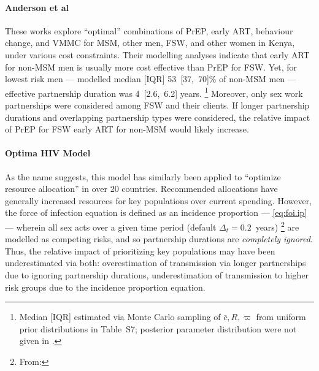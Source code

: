 \paragraph{Anderson et al}\cite{Anderson2014,Anderson2017,Anderson2018}  %
These works explore ``optimal'' combinations of PrEP, early ART, behaviour change, and VMMC  
for MSM, other men, FSW, and other women in Kenya, under various cost constraints.
Their modelling analyses indicate that
early ART for non-MSM men is usually more cost effective than PrEP for FSW.
Yet, for lowest risk men --- modelled median [IQR] 53~[37,~70]\% of non-MSM men ---
effective partnership duration was 4~[2.6,~6.2] years.%
\footnote{Median [IQR] estimated via Monte Carlo sampling of $\bar{c}, R, \varpi$
  from uniform prior distributions in Table~S7;
  posterior parameter distribution were not given in \cite{Anderson2014}.}
Moreover, only sex work partnerships were considered among FSW and their clients.
If longer partnership durations and overlapping partnership types were considered,
the relative impact of PrEP for FSW \vs early ART for non-MSM would likely increase.
\paragraph{Optima HIV Model}\cite{Kerr2015,Stuart2018,Kerr2020,Optima2021}
As the name suggests, this model has similarly been applied to
``optimize resource allocation'' in over 20 countries.
Recommended allocations have generally increased resources for key populations over current spending.
However, the force of infection equation is defined as
an incidence proportion \cite{Kerr2020} --- \eqref{eq:foi.ip} ---
wherein all sex acts over a given time period (default $\Delta_t = 0.2$~years)%
\footnote{From: }
are modelled as competing risks, and so partnership durations are \emph{completely ignored}.
Thus, the relative impact of prioritizing key populations may have been underestimated via both: %
overestimation of transmission via longer partnerships due to ignoring partnership durations,
underestimation of transmission to higher risk groups due to the incidence proportion equation.
